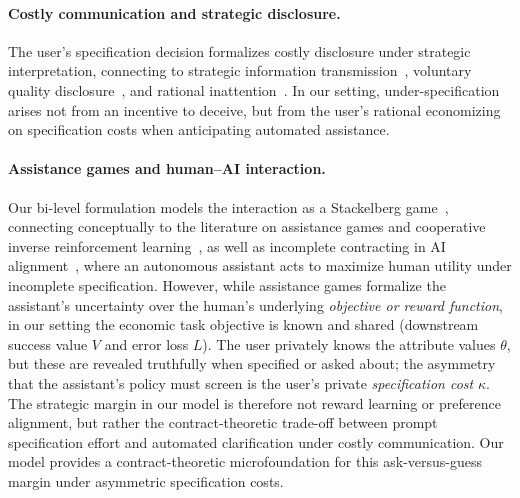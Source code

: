 \documentclass[11pt]{article}
\begin{document}
\paragraph{Costly communication and strategic disclosure.}
The user's specification decision formalizes costly disclosure under strategic interpretation, connecting to strategic information transmission~\citep{crawford-sobel1982}, voluntary quality disclosure~\citep{grossman1981}, and rational inattention~\citep{sims2003}. In our setting, under-specification arises not from an incentive to deceive, but from the user's rational economizing on specification costs when anticipating automated assistance.

\paragraph{Assistance games and human--AI interaction.}
Our bi-level formulation models the interaction as a Stackelberg game~\citep{stackelberg1934}, connecting conceptually to the literature on assistance games and cooperative inverse reinforcement learning~\citep{hadfield-menell2016}, as well as incomplete contracting in AI alignment~\citep{hadfield-menell-hadfield2019}, where an autonomous assistant acts to maximize human utility under incomplete specification. However, while assistance games formalize the assistant's uncertainty over the human's underlying \emph{objective or reward function}, in our setting the economic task objective is known and shared (downstream success value $V$ and error loss $L$). The user privately knows the attribute values $\theta$, but these are revealed truthfully when specified or asked about; the asymmetry that the assistant's policy must screen is the user's private \emph{specification cost} $\kappa$. The strategic margin in our model is therefore not reward learning or preference alignment, but rather the contract-theoretic trade-off between prompt specification effort and automated clarification under costly communication. Our model provides a contract-theoretic microfoundation for this ask-versus-guess margin under asymmetric specification costs.
\end{document}
